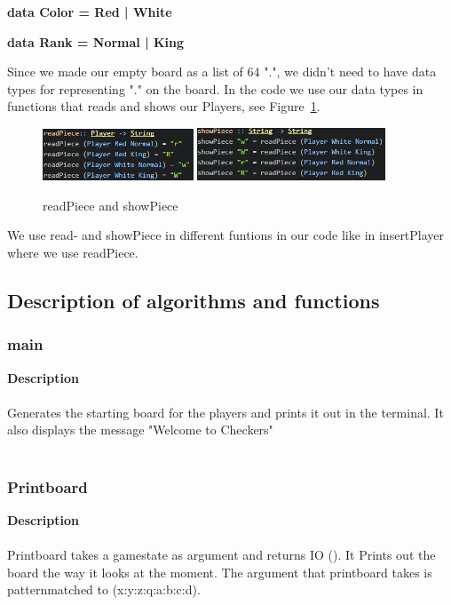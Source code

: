 \documentclass[12pt,a4paper]{article}
\begin{document}
\textbf{data Color = Red | White}

\textbf{data Rank = Normal | King}

Since we made our empty board as a list of 64 ".", we didn't need to have data types for representing "." on the board. In the code we use our data types in functions that reads and shows our Players, see Figure~\ref{fig8}. 

\begin{figure}[htp]
\centering
\includegraphics[width= 0.4\textwidth]{read.PNG}
\includegraphics[width= 0.5\textwidth]{show.PNG}
\caption{readPiece and showPiece}
\label{fig8}
\end{figure}

 

We use read- and showPiece in different funtions in our code like in insertPlayer where we use readPiece.

\subsection{Description of algorithms and functions}
\subsubsection{main}
\textbf{Description} \\\\
Generates the starting board for the players and prints it out in the terminal.
It also displays the message "Welcome to Checkers"\\\\
\subsubsection{Printboard}

\textbf{Description}\\\\
Printboard takes a gamestate as argument and returns IO (). It Prints out the board the way it looks at the moment. The argument that printboard takes is patternmatched to (x:y:z:q:a:b:c:d). 
\end{document}
